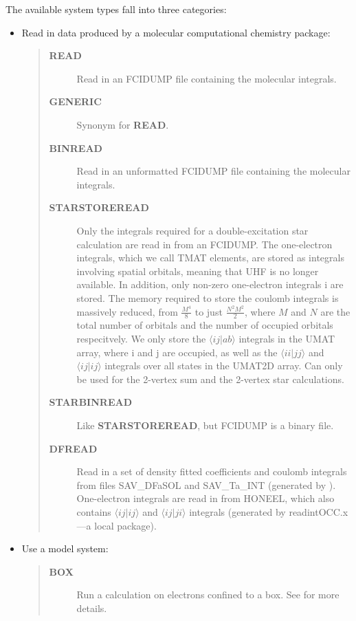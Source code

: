 \documentclass[openany,a4paper,10pt]{manual}
\newcommand{\bra}{\ensuremath{\langle}}
\newcommand{\ket}{\ensuremath{\rangle}}
\begin{document}
The available system types fall into three categories:
\begin{itemize}
\item {} 
Read in data produced by a molecular computational chemistry package:
\begin{quote}
\begin{description}
\item[\textbf{READ}]
Read in an FCIDUMP file containing the molecular integrals.

\item[\textbf{GENERIC}]
Synonym for \textbf{READ}.

\item[\textbf{BINREAD}]
Read in an unformatted FCIDUMP file containing the molecular
integrals.

\item[\textbf{STARSTOREREAD}]
Only the integrals required for a double-excitation star
calculation are read in from an FCIDUMP.  The one-electron
integrals, which we call TMAT elements, are stored as integrals
involving spatial orbitals, meaning that UHF is no longer
available.  In addition, only non-zero one-electron integrals i
are stored. The memory required to store the coulomb integrals
is massively reduced, from  $\frac{M^4}{8}$ to just
$\frac{N^{2} M^{2}}{2}$, where $M$ and $N$ are
the total number of orbitals and the number of occupied orbitals
respecitvely.  We only store the $\bra ij | ab \ket$
integrals in the UMAT array, where i and j are occupied, as well
as the $\bra ii | jj \ket$ and $\bra ij | ij \ket$
integrals over all states in the UMAT2D array.  Can only
be used for the 2-vertex sum and the 2-vertex star calculations.

\item[\textbf{STARBINREAD}]
Like \textbf{STARSTOREREAD}, but FCIDUMP is a binary file.

\item[\textbf{DFREAD}]
Read in a set of density fitted coefficients and coulomb integrals
from files SAV\_DFaSOL and SAV\_Ta\_INT (generated by \cite{CamCasp}).
One-electron integrals are read in from HONEEL, which also contains
$\bra ij | ij \ket$ and $\bra ij | ji \ket$ integrals
(generated by readintOCC.x---a local package).

\end{description}
\end{quote}

\item {} 
Use a model system:
\begin{quote}
\begin{description}
\item[\textbf{BOX}]
Run a calculation on electrons confined to a box.  See \cite{TwoElBox}
for more details.


\end{description}
\end{quote}
\end{itemize}
\end{document}
